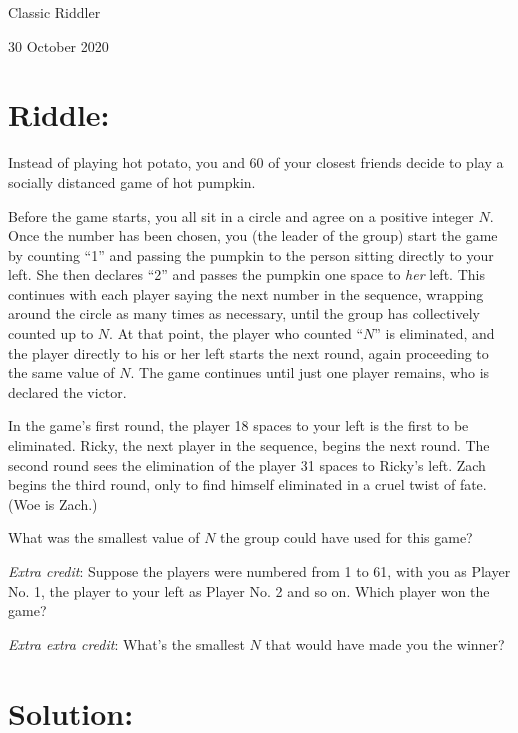 \documentclass{article}
\begin{document}
\pagestyle{empty} %

\begin{center}
{\LARGE Classic Riddler}

\vspace{0.15in}

{\Large 30 October 2020}
\end{center}


\section*{Riddle:}

Instead of playing hot potato, you and 60 of your closest friends decide to play a socially distanced game of hot pumpkin.

Before the game starts, you all sit in a circle and agree on a positive integer $N$.
Once the number has been chosen, you (the leader of the group) start the game by counting ``1'' and passing the pumpkin to the person sitting directly to your left.
She then declares ``2'' and passes the pumpkin one space to \textit{her} left.
This continues with each player saying the next number in the sequence, wrapping around the circle as many times as necessary, until the group has collectively counted up to $N$.
At that point, the player who counted ``$N$'' is eliminated, and the player directly to his or her left starts the next round, again proceeding to the same value of $N$.
The game continues until just one player remains, who is declared the victor.

In the game's first round, the player 18 spaces to your left is the first to be eliminated.
Ricky, the next player in the sequence, begins the next round.
The second round sees the elimination of the player 31 spaces to Ricky's left.
Zach begins the third round, only to find himself eliminated in a cruel twist of fate.
(Woe is Zach.)

What was the smallest value of $N$ the group could have used for this game?

\textit{Extra credit}: Suppose the players were numbered from 1 to 61, with you as Player No. 1, the player to your left as Player No. 2 and so on.
Which player won the game?

\textit{Extra extra credit}: What's the smallest $N$ that would have made you the winner?

\section*{Solution:}
\end{document}

